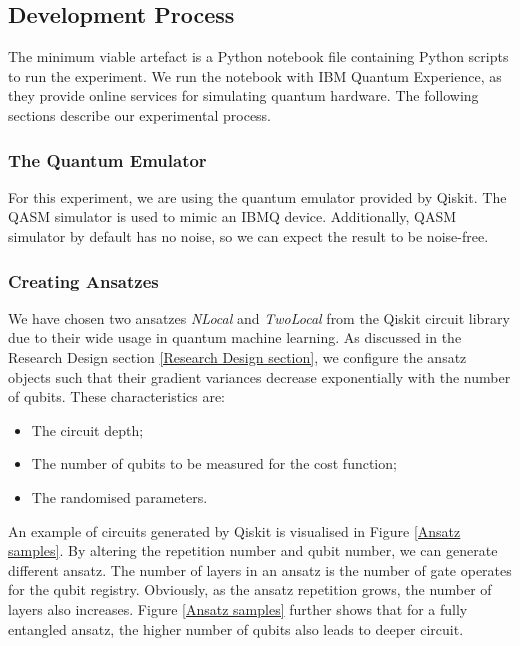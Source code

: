 \subsection{Development Process} \label{Development Process section}
The minimum viable artefact is a Python notebook file containing Python scripts to run the experiment.
We run the notebook with IBM Quantum Experience, as they provide online services for simulating quantum hardware.
The following sections describe our experimental process.

\subsubsection{The Quantum Emulator}
For this experiment, we are using the quantum emulator provided by Qiskit.
The QASM simulator is used to mimic an IBMQ device.
Additionally, QASM simulator by default has no noise, so we can expect the result to be noise-free.

\subsubsection{Creating Ansatzes}
We have chosen two ansatzes \textit{NLocal} and \textit{TwoLocal} from the Qiskit circuit library due to their wide usage in quantum machine learning.
As discussed in the Research Design section \ref{Research Design section}, we configure the ansatz objects such that their gradient variances decrease exponentially with the number of qubits.
These characteristics are:
\begin{itemize}
    \item The circuit depth;
    \item The number of qubits to be measured for the cost function;
    \item The randomised parameters.
\end{itemize}

An example of circuits generated by Qiskit is visualised in Figure \ref{Ansatz samples}.
By altering the repetition number and qubit number, we can generate different ansatz.
The number of layers in an ansatz is the number of gate operates for the qubit registry.
Obviously, as the ansatz repetition grows, the number of layers also increases.
Figure \ref{Ansatz samples} further shows that for a fully entangled ansatz, the higher number of qubits also leads to deeper circuit.

